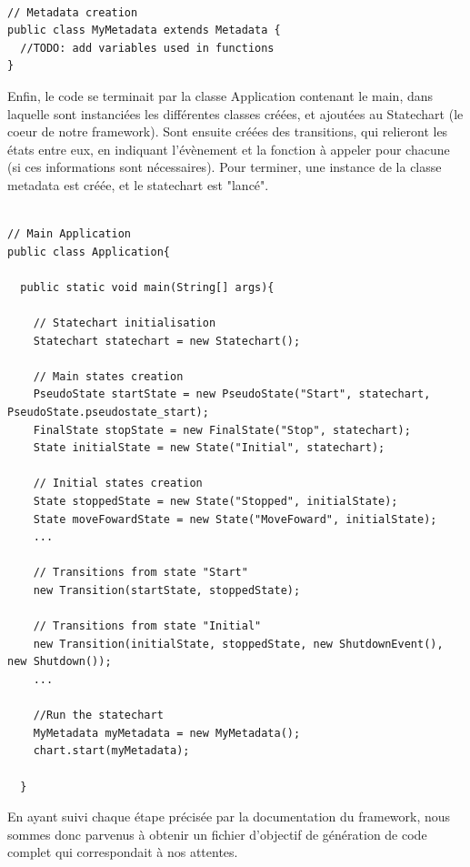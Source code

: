 \documentclass[french, 12pt, a4paper]{article}
\begin{document}
      \begin{lstlisting}[caption={Création de la classe metadata},basicstyle=\small]

// Metadata creation
public class MyMetadata extends Metadata {
  //TODO: add variables used in functions
}
    \end{lstlisting}
    
    Enfin, le code se terminait par la classe Application contenant le main, dans laquelle sont instanciées les différentes classes créées, et ajoutées au Statechart (le coeur de notre framework). Sont ensuite créées des transitions, qui relieront les états entre eux, en indiquant l'évènement et la fonction à appeler pour chacune (si ces informations sont nécessaires). Pour terminer, une instance de la classe metadata est créée, et le statechart est "lancé".
    
  \begin{lstlisting}[caption={Création de la classe Application},basicstyle=\small]

// Main Application
public class Application{

  public static void main(String[] args){

    // Statechart initialisation
    Statechart statechart = new Statechart();

    // Main states creation
    PseudoState startState = new PseudoState("Start", statechart, PseudoState.pseudostate_start);
    FinalState stopState = new FinalState("Stop", statechart);
    State initialState = new State("Initial", statechart);

    // Initial states creation
    State stoppedState = new State("Stopped", initialState);
    State moveFowardState = new State("MoveFoward", initialState);
    ...

    // Transitions from state "Start"
    new Transition(startState, stoppedState);

    // Transitions from state "Initial"
    new Transition(initialState, stoppedState, new ShutdownEvent(), new Shutdown());
    ...

    //Run the statechart
    MyMetadata myMetadata = new MyMetadata();
    chart.start(myMetadata);

  }
    \end{lstlisting}
    
    En ayant suivi chaque étape précisée par la documentation du framework, nous sommes donc parvenus à obtenir un fichier d'objectif de génération de code complet qui correspondait à nos attentes.
    
\end{document}
